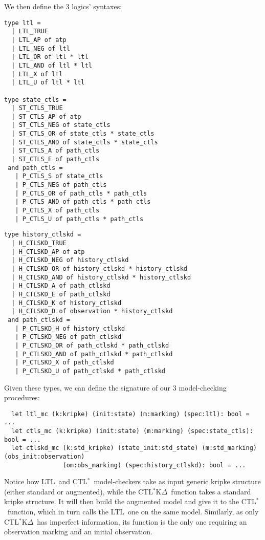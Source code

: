\documentclass[dvipsnames]{acmart}
\def\ctls{CTL$^{*}$}
\def\ctlskd{CTL$^{*}$K$\Delta$}
\def\ltl{LTL}
\begin{document}
We then define the 3 logics' syntaxes:
\begin{center}
  \begin{minipage}[t]{0.4\linewidth}
\begin{lstlisting}
type ltl =
  | LTL_TRUE
  | LTL_AP of atp
  | LTL_NEG of ltl
  | LTL_OR of ltl * ltl
  | LTL_AND of ltl * ltl
  | LTL_X of ltl
  | LTL_U of ltl * ltl

type state_ctls =
  | ST_CTLS_TRUE
  | ST_CTLS_AP of atp
  | ST_CTLS_NEG of state_ctls
  | ST_CTLS_OR of state_ctls * state_ctls
  | ST_CTLS_AND of state_ctls * state_ctls
  | ST_CTLS_A of path_ctls
  | ST_CTLS_E of path_ctls
 and path_ctls =
   | P_CTLS_S of state_ctls
   | P_CTLS_NEG of path_ctls
   | P_CTLS_OR of path_ctls * path_ctls
   | P_CTLS_AND of path_ctls * path_ctls
   | P_CTLS_X of path_ctls
   | P_CTLS_U of path_ctls * path_ctls
 \end{lstlisting}
\end{minipage}
\begin{minipage}[t]{0.5\linewidth}
\begin{lstlisting}
type history_ctlskd =
  | H_CTLSKD_TRUE
  | H_CTLSKD_AP of atp
  | H_CTLSKD_NEG of history_ctlskd
  | H_CTLSKD_OR of history_ctlskd * history_ctlskd
  | H_CTLSKD_AND of history_ctlskd * history_ctlskd
  | H_CTLSKD_A of path_ctlskd
  | H_CTLSKD_E of path_ctlskd
  | H_CTLSKD_K of history_ctlskd
  | H_CTLSKD_D of observation * history_ctlskd
 and path_ctlskd =
   | P_CTLSKD_H of history_ctlskd
   | P_CTLSKD_NEG of path_ctlskd
   | P_CTLSKD_OR of path_ctlskd * path_ctlskd
   | P_CTLSKD_AND of path_ctlskd * path_ctlskd
   | P_CTLSKD_X of path_ctlskd
   | P_CTLSKD_U of path_ctlskd * path_ctlskd
\end{lstlisting}
\end{minipage}
\end{center}

Given these types, we can define the signature of our 3 model-checking procedures:

\begin{lstlisting}
  let ltl_mc (k:kripke) (init:state) (m:marking) (spec:ltl): bool = ...
  let ctls_mc (k:kripke) (init:state) (m:marking) (spec:state_ctls): bool = ...
  let ctlskd_mc (k:std_kripke) (state_init:std_state) (m:std_marking) (obs_init:observation)
                (om:obs_marking) (spec:history_ctlskd): bool = ...
\end{lstlisting}

Notice how \ltl\ and \ctls\ model-checkers take as input generic kripke structure (either standard or augmented), while the \ctlskd\ function takes a standard kripke structure. It will then build the augmented model and give it to the \ctls\ function, which in turn calls the \ltl\ one on the same model.
Similarly, as only \ctlskd\ has imperfect information, its function is the only one requiring an observation marking and an initial observation.
\end{document}
